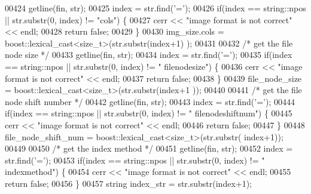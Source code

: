 \begin{DoxyCode}
00424                 getline(fin, str);
00425                 index = str.find(\textcolor{charliteral}{'='});
00426                 \textcolor{keywordflow}{if}(index == string::npos || str.substr(0, index) != \textcolor{stringliteral}{"cols"}) \{
00427                         cerr << \textcolor{stringliteral}{"image format is not correct"} << endl;
00428                         \textcolor{keywordflow}{return} \textcolor{keyword}{false};
00429                 \}
00430                 img\_size.cols = boost::lexical\_cast<\textcolor{keywordtype}{size\_t}>(str.substr(index+1)
      );
00431 
00432                 \textcolor{comment}{/* get the file node size */}
00433                 getline(fin, str);
00434                 index = str.find(\textcolor{charliteral}{'='});
00435                 \textcolor{keywordflow}{if}(index == string::npos || str.substr(0, index) != \textcolor{stringliteral}{"
      filenodesize"}) \{
00436                         cerr << \textcolor{stringliteral}{"image format is not correct"} << endl;
00437                         \textcolor{keywordflow}{return} \textcolor{keyword}{false};
00438                 \}
00439                 file\_node\_size = boost::lexical\_cast<\textcolor{keywordtype}{size\_t}>(str.substr(index+1
      ));
00440 
00441                 \textcolor{comment}{/* get the file node shift number */}
00442                 getline(fin, str);
00443                 index = str.find(\textcolor{charliteral}{'='});
00444                 \textcolor{keywordflow}{if}(index == string::npos || str.substr(0, index) != \textcolor{stringliteral}{"
      filenodeshiftnum"}) \{
00445                         cerr << \textcolor{stringliteral}{"image format is not correct"} << endl;
00446                         \textcolor{keywordflow}{return} \textcolor{keyword}{false};
00447                 \}
00448                 file\_node\_shift\_num = boost::lexical\_cast<\textcolor{keywordtype}{size\_t}>(str.substr(
      index+1));
00449 
00450                 \textcolor{comment}{/* get the index method */}
00451                 getline(fin, str);
00452                 index = str.find(\textcolor{charliteral}{'='});
00453                 \textcolor{keywordflow}{if}(index == string::npos || str.substr(0, index) != \textcolor{stringliteral}{"
      indexmethod"}) \{
00454                         cerr << \textcolor{stringliteral}{"image format is not correct"} << endl;
00455                         \textcolor{keywordflow}{return} \textcolor{keyword}{false};
00456                 \}
00457                 \textcolor{keywordtype}{string} index\_str = str.substr(index+1);

\end{DoxyCode}
